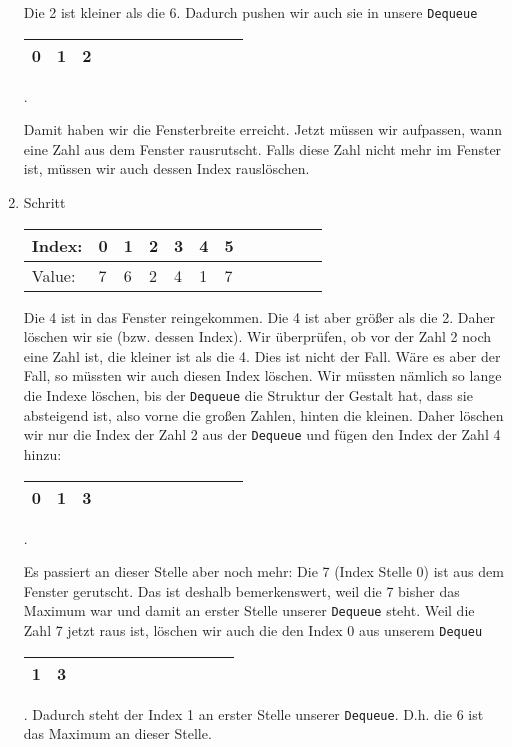 \documentclass{book}
\begin{document}
\begin{enumerate}
	Die 2 ist kleiner als die 6. Dadurch pushen wir auch sie in unsere \lstinline|Dequeue|
	\begin{tabular}{|l|l|l|l|l|l|l|l|l|l|l|l|} 
		\hline
		0 & 1 & 2\\
		\hline
	\end{tabular}.

Damit haben wir die Fensterbreite erreicht. Jetzt müssen wir aufpassen, wann eine Zahl aus dem Fenster rausrutscht. Falls diese Zahl nicht mehr im Fenster ist, müssen wir auch dessen Index rauslöschen.
	
	\item Schritt
	
	\begin{tabular}{|l|l|l|l|l|l|l|l|l|l|l|l|} 
		\hline
		Index: & 0 & \cellcolor{yellow!25}1 & \cellcolor{yellow!25}2 & \cellcolor{yellow!25}3 & 4 & 5\\ 
		\hline
		Value: & 7 & \cellcolor{blue!25}6 & \cellcolor{blue!25}2 & \cellcolor{blue!25}4 & 1 & 7\\
		\hline
	\end{tabular}
	Die 4 ist in das Fenster reingekommen. Die 4 ist aber größer als die 2. Daher löschen wir sie (bzw. dessen Index). Wir überprüfen, ob vor der Zahl 2 noch eine Zahl ist, die kleiner ist als die 4. Dies ist nicht der Fall. Wäre es aber der Fall, so müssten wir auch diesen Index löschen. Wir müssten nämlich so lange die Indexe löschen, bis der \lstinline|Dequeue| die Struktur der Gestalt hat, dass sie absteigend ist, also vorne die großen Zahlen, hinten die kleinen. Daher löschen wir nur die Index der Zahl 2 aus der \lstinline|Dequeue| und fügen den Index der Zahl 4 hinzu: 
	
	\begin{tabular}{|l|l|l|l|l|l|l|l|l|l|l|l|} 
		\hline
		0 & 1 & 3\\
		\hline
	\end{tabular}.
	
	Es passiert an dieser Stelle aber noch mehr: Die 7 (Index Stelle 0) ist aus dem Fenster gerutscht. Das ist deshalb bemerkenswert, weil die 7 bisher das Maximum war und damit an erster Stelle unserer \lstinline|Dequeue| steht. Weil die Zahl 7 jetzt raus ist, löschen wir auch die den Index 0 aus unserem \lstinline|Dequeu|
		\begin{tabular}{|l|l|l|l|l|l|l|l|l|l|l|l|} 
		\hline
		1 & 3\\
		\hline
	\end{tabular}.
	Dadurch steht der Index 1 an erster Stelle unserer \lstinline|Dequeue|. D.h. die 6 ist das Maximum an dieser Stelle.
\end{enumerate}
\end{document}
